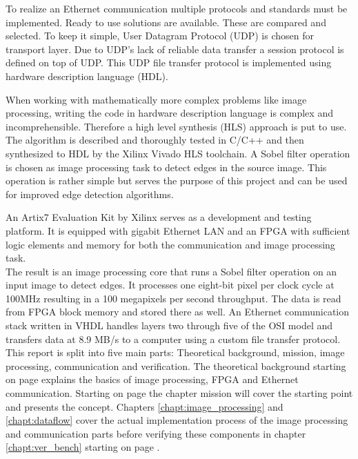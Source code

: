 To realize an Ethernet communication multiple protocols and standards must be
implemented. Ready to use solutions are available. These are compared and
selected. To keep it simple, User Datagram Protocol (UDP) is chosen for
transport layer. Due to UDP's lack of reliable data transfer a session protocol
is defined on top of UDP. This UDP file transfer protocol is implemented using
hardware description language (HDL).

When working with mathematically more complex problems like image processing,
writing the code in hardware description language is complex and
incomprehensible. Therefore a high level synthesis (HLS) approach is put to use.
The algorithm is described and thoroughly tested in C/C++ and then synthesized to
HDL by the Xilinx Vivado HLS toolchain. A Sobel filter operation is chosen as
image processing task to detect edges in the source image. This operation is
rather simple but serves the purpose of this project and can be used for
improved edge detection algorithms.

An Artix7 Evaluation Kit by Xilinx serves as a development and testing platform.
It is equipped with gigabit Ethernet LAN and an FPGA with sufficient logic
elements and memory for both the communication and image processing task.
\\

The result is an image processing core that runs a Sobel filter operation on an
input
image to detect edges. It processes one eight-bit pixel per clock cycle at
100MHz
resulting in a 100 megapixels per second throughput. The
data is read from FPGA block memory and stored there as well. An Ethernet
communication stack written in VHDL handles layers two through five of the OSI
model and transfers data at 8.9 MB/s to a computer using a custom file
transfer protocol.
\\

This report is split into five main parts: Theoretical background, mission,
image processing, communication and verification. 
The theoretical background starting
on page \pageref{chapt:theoreticalback} explains the basics of image
processing, FPGA and Ethernet communication. Starting on page 
\pageref{chapt:mission} the chapter mission will cover the starting point and
presents the concept. Chapters \ref{chapt:image_processing} and \ref{chapt:dataflow} cover the actual implementation process of the image processing and communication parts
before verifying these components in chapter \ref{chapt:ver_bench} starting
on page \pageref{chapt:ver_bench}.

